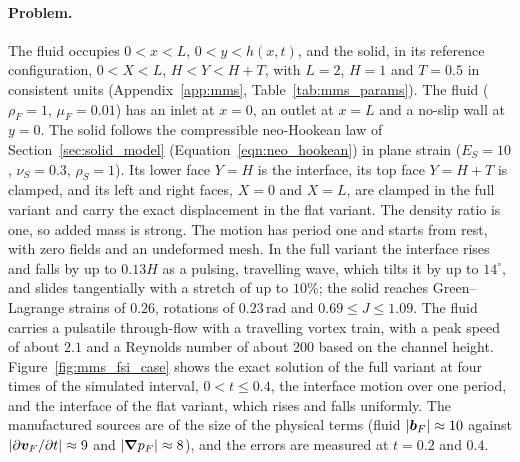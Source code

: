 \paragraph{Problem.}
The fluid occupies $0<x<L$, $0<y<h(x,t)$, and the solid, in its reference configuration, $0<X<L$, $H<Y<H+T$, with $L = 2$, $H = 1$ and $T = 0.5$ in consistent units (Appendix~\ref{app:mms}, Table~\ref{tab:mms_params}).
The fluid ($\rho_F = 1$, $\mu_F = 0.01$) has an inlet at $x = 0$, an outlet at $x = L$ and a no-slip wall at $y = 0$.
The solid follows the compressible neo-Hookean law of Section~\ref{sec:solid_model} (Equation~\eqref{eqn:neo_hookean}) in plane strain ($E_S = 10$, $\nu_S = 0.3$, $\rho_S = 1$).
Its lower face $Y = H$ is the interface, its top face $Y = H + T$ is clamped, and its left and right faces, $X = 0$ and $X = L$, are clamped in the full variant and carry the exact displacement in the flat variant.
The density ratio is one, so added mass is strong.
The motion has period one and starts from rest, with zero fields and an undeformed mesh.
In the full variant the interface rises and falls by up to $0.13H$ as a pulsing, travelling wave, which tilts it by up to $14^\circ$, and slides tangentially with a stretch of up to $10\%$; the solid reaches Green--Lagrange strains of $0.26$, rotations of $0.23\,\mathrm{rad}$ and $0.69 \le J \le 1.09$.
The fluid carries a pulsatile through-flow with a travelling vortex train, with a peak speed of about $2.1$ and a Reynolds number of about 200 based on the channel height.
Figure~\ref{fig:mms_fsi_case} shows the exact solution of the full variant at four times of the simulated interval, $0 < t \le 0.4$, the interface motion over one period, and the interface of the flat variant, which rises and falls uniformly.
The manufactured sources are of the size of the physical terms (fluid $|\boldsymbol{b}_F| \approx 10$ against $|\partial\boldsymbol{v}_F/\partial t| \approx 9$ and $|\boldsymbol{\nabla}p_F| \approx 8$), and the errors are measured at $t = 0.2$ and $0.4$.

